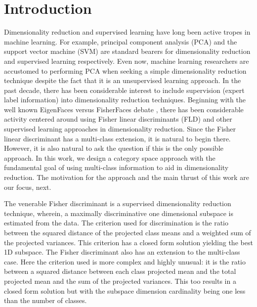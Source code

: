 
\section{Introduction\label{Introduction} }

Dimensionality reduction and supervised learning have long been active
tropes in machine learning. For example, principal component analysis
(PCA) and the support vector machine (SVM) are standard bearers for
dimensionality reduction and supervised learning respectively. Even
now, machine learning researchers are accustomed to performing PCA
when seeking a simple dimensionality reduction technique despite the
fact that it is an unsupervised learning approach. In the past decade,
there has been considerable interest to include supervision (expert
label information) into dimensionality reduction techniques. Beginning
with the well known EigenFaces versus FisherFaces debate \citep{BelhumeurHespanhaKriegman1997},
there has been considerable activity centered around using Fisher
linear discriminants (FLD) and other supervised learning approaches
in dimensionality reduction. Since the Fisher linear discriminant
has a multi-class extension, it is natural to begin there. However,
it is also natural to ask the question if this is the only possible
approach. In this work, we design a category space approach with the
fundamental goal of using multi-class information to aid in dimensionality
reduction. The motivation for the approach and the main thrust of
this work are our focus, next.

The venerable Fisher discriminant is a supervised dimensionality reduction
technique, wherein, a maximally discriminative one dimensional subspace
is estimated from the data. The criterion used for discrimination
is the ratio between the squared distance of the projected class means
and a weighted sum of the projected variances. This criterion has
a closed form solution yielding the best 1D subspace. The Fisher discriminant
also has an extension to the multi-class case. Here the criterion
used is more complex and highly unusual: it is the ratio between a
squared distance between each class projected mean and the total projected
mean and the sum of the projected variances. This too results in a
closed form solution but with the subspace dimension cardinality being
one less than the number of classes.


